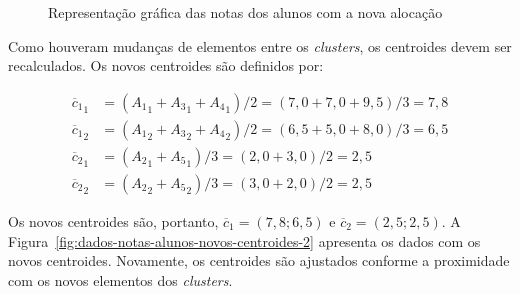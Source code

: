 \begin{figure}[h]
	\centering
	
	
	
	\caption{Representação gráfica das notas dos alunos com a nova alocação}
	\label{fig:dados-notas-alunos-nova-alocacao}
\end{figure}

Como houveram mudanças de elementos entre os \textit{clusters}, os centroides devem ser recalculados. Os novos centroides são definidos por:

\begin{align*}
	{\overline{c}_1}_1 &= ({A_1}_1 + {A_3}_1 + {A_4}_1)/2 = (7,0 + 7,0 + 9,5)/3 = 7,8 \\
	{\overline{c}_1}_2 &= ({A_1}_2 + {A_3}_2 + {A_4}_2)/2 = (6,5 + 5,0 + 8,0)/3 = 6,5 \\
	{\overline{c}_2}_1 &= ({A_2}_1 + {A_5}_1)/3 = (2,0 + 3,0)/2 = 2,5 \\
	{\overline{c}_2}_2 &= ({A_2}_2 + {A_5}_2)/3 = (3,0 + 2,0)/2 = 2,5
\end{align*}

Os novos centroides são, portanto, $\overline{c}_1 = (7,8; 6,5)$ e $\overline{c}_2 = (2,5; 2,5)$. A Figura~\ref{fig:dados-notas-alunos-novos-centroides-2} apresenta os dados com os novos centroides. Novamente, os centroides são ajustados conforme a proximidade com os novos elementos dos \textit{clusters}.

